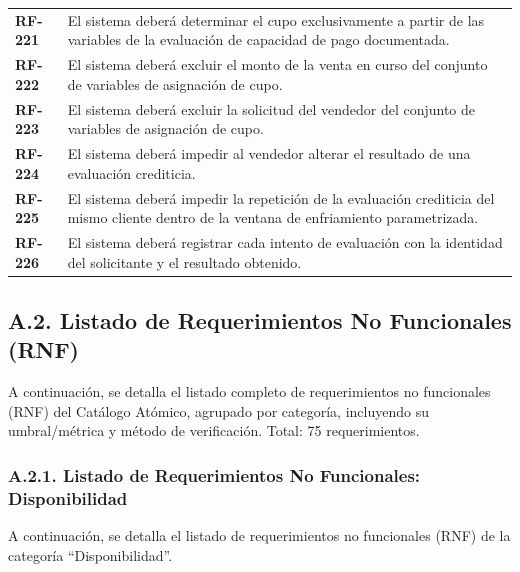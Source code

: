 \documentclass[11pt]{article}
\begin{document}
\begin{longtable}[]{@{}
  >{\raggedright\arraybackslash}p{}
  >{\raggedright\arraybackslash}p{}@{}}
\addlinespace[2pt]
\textbf{RF-221} & El sistema deberá determinar el cupo exclusivamente a partir de las variables de la evaluación de capacidad de pago documentada. \\
\addlinespace[2pt]
\textbf{RF-222} & El sistema deberá excluir el monto de la venta en curso del conjunto de variables de asignación de cupo. \\
\addlinespace[2pt]
\textbf{RF-223} & El sistema deberá excluir la solicitud del vendedor del conjunto de variables de asignación de cupo. \\
\addlinespace[2pt]
\textbf{RF-224} & El sistema deberá impedir al vendedor alterar el resultado de una evaluación crediticia. \\
\addlinespace[2pt]
\textbf{RF-225} & El sistema deberá impedir la repetición de la evaluación crediticia del mismo cliente dentro de la ventana de enfriamiento parametrizada. \\
\addlinespace[2pt]
\textbf{RF-226} & El sistema deberá registrar cada intento de evaluación con la identidad del solicitante y el resultado obtenido. \\
\end{longtable}

\subsection{A.2. Listado de Requerimientos No Funcionales (RNF)}\label{a-2-listado-de-requerimientos-no-funcionales-rnf}

A continuación, se detalla el listado completo de requerimientos no funcionales (RNF) del Catálogo Atómico, agrupado por categoría, incluyendo su umbral/métrica y método de verificación. Total: 75 requerimientos.

\subsubsection{A.2.1. Listado de Requerimientos No Funcionales: Disponibilidad}\label{a-2-1-listado-de-requerimientos-no-funcionales-disponibilidad}

A continuación, se detalla el listado de requerimientos no funcionales (RNF) de la categoría ``Disponibilidad''.
\end{document}

